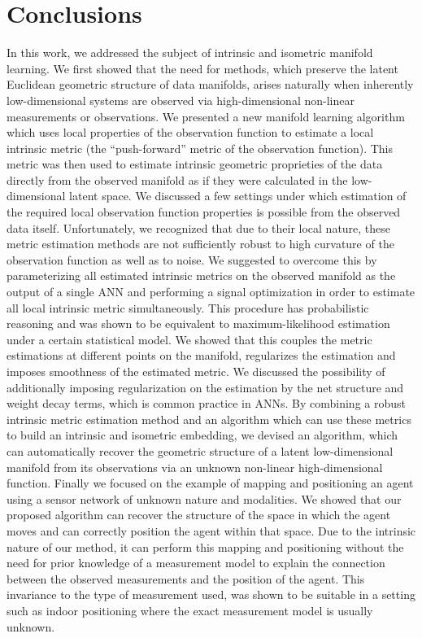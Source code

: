 
	\section{Conclusions}
		\label{sec:conclusions}
		
		In this work, we addressed the subject of intrinsic and isometric
	manifold learning. We first showed that the need for methods, which
	preserve the latent Euclidean geometric structure of data manifolds,
	arises naturally when inherently low-dimensional systems are observed
	via high-dimensional non-linear measurements or observations. We presented
	a new manifold learning algorithm which uses local properties of the
	observation function to estimate a local intrinsic metric (the ``push-forward''
	metric of the observation function). This metric was then used to
	estimate intrinsic geometric proprieties of the data directly from
	the observed manifold as if they were calculated in the low-dimensional
	latent space. We discussed a few settings under which estimation of
	the required local observation function properties is possible from
	the observed data itself. Unfortunately, we recognized that due to
	their local nature, these metric estimation methods are not sufficiently
	robust to high curvature of the observation function as well as to
	noise. We suggested to overcome this by parameterizing all estimated
	intrinsic metrics on the observed manifold as the output of a single
	\ac{ANN} and performing a signal optimization in order to estimate
	all local intrinsic metric simultaneously. This procedure has probabilistic
	reasoning and was shown to be equivalent to maximum-likelihood estimation
	under a certain statistical model. We showed that this couples the
	metric estimations at different points on the manifold, regularizes
	the estimation and imposes smoothness of the estimated metric. We
	discussed the possibility of additionally imposing regularization
	on the estimation by the net structure and weight decay terms, which
	is common practice in \acp{ANN}. By combining a robust intrinsic
	metric estimation method and an algorithm which can use these metrics
	to build an intrinsic and isometric embedding, we devised an algorithm,
	which can automatically recover the geometric structure of a latent
	low-dimensional manifold from its observations via an unknown non-linear
	high-dimensional function. Finally we focused on the example of mapping
	and positioning an agent using a sensor network of unknown nature
	and modalities. We showed that our proposed algorithm can recover
	the structure of the space in which the agent moves and can correctly
	position the agent within that space. Due to the intrinsic nature
	of our method, it can perform this mapping and positioning without
	the need for prior knowledge of a measurement model to explain the
	connection between the observed measurements and the position of the
	agent. This invariance to the type of measurement used, was shown
	to be suitable in a setting such as indoor positioning where the exact
	measurement model is usually unknown.
	
